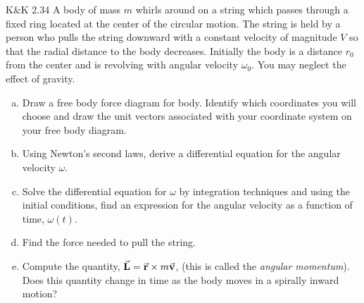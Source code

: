 \documentclass{esg8012pset}
\begin{document}
\begin{problem}{K\&K 2.34}
  A body of mass $m$ whirls around on a string which passes through a fixed ring located at the center of the circular motion. The string is held by a person who pulls the string downward with a constant velocity of magnitude $V$ so that the radial distance to the body decreases. Initially the body is a distance $r_0$ from the center and is revolving
with angular velocity $\omega_0$. You may neglect the effect of gravity.
  \begin{enumerate}[a)]
    \item Draw a free body force diagram for body. Identify which coordinates you will choose and draw the unit vectors associated with your coordinate system on your free body diagram.
    \item Using Newton's second laws, derive a differential equation for the angular velocity $\omega$.
    \item Solve the differential equation for $\omega$ by integration techniques and using the initial conditions, find an expression for the angular velocity as a function of time, $\omega(t)$.
    \item Find the force needed to pull the string.
    \item Compute the quantity, $\vec{\bf{L}} = \vec{\bf{r}}\times m\vec{\bf{v}}$, (this is called the \emph{angular momentum}). Does this quantity change in time as the body moves in a spirally inward motion?
  \end{enumerate}
\end{problem}
\end{document}
